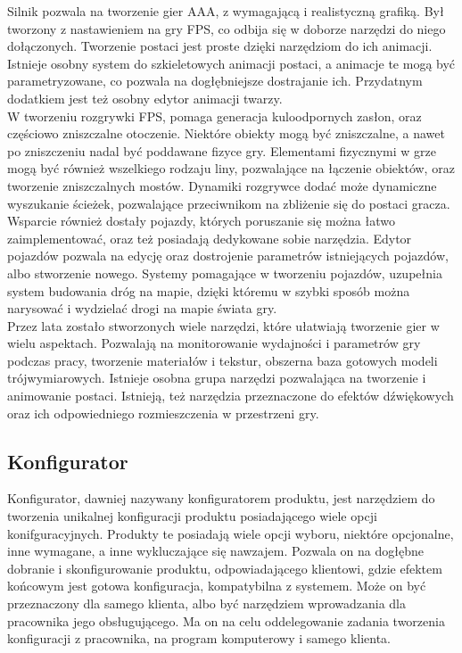 \documentclass{article} %
\begin{document}
        Silnik pozwala na tworzenie gier AAA, z wymagającą i realistyczną grafiką. Był tworzony z nastawieniem na gry FPS, co odbija się w doborze narzędzi do niego dołączonych. Tworzenie postaci jest proste dzięki narzędziom do ich animacji. Istnieje osobny system do szkieletowych animacji postaci, a animacje te mogą być parametryzowane, co pozwala na dogłębniejsze dostrajanie ich. Przydatnym dodatkiem jest też osobny edytor animacji twarzy.
        \\
        
        W tworzeniu rozgrywki FPS, pomaga generacja kuloodpornych zasłon, oraz częściowo zniszczalne otoczenie. Niektóre obiekty mogą być zniszczalne, a nawet po zniszczeniu nadal być poddawane fizyce gry. Elementami fizycznymi w grze mogą być również wszelkiego rodzaju liny, pozwalające na łączenie obiektów, oraz tworzenie zniszczalnych mostów. Dynamiki rozgrywce dodać może dynamiczne wyszukanie ścieżek, pozwalające przeciwnikom na zbliżenie się do postaci gracza.
        \\
        
        Wsparcie również dostały pojazdy, których poruszanie się można łatwo zaimplementować, oraz też posiadają dedykowane sobie narzędzia. Edytor pojazdów pozwala na edycję oraz dostrojenie parametrów istniejących pojazdów, albo stworzenie nowego. Systemy pomagające w tworzeniu pojazdów, uzupełnia system budowania dróg na mapie, dzięki któremu w szybki sposób można narysować i wydzielać drogi na mapie świata gry.
        \\
        
        Przez lata zostało stworzonych wiele narzędzi, które ułatwiają tworzenie gier w wielu aspektach. Pozwalają na monitorowanie wydajności i parametrów gry podczas pracy, tworzenie materiałów i tekstur, obszerna baza gotowych modeli trójwymiarowych. Istnieje osobna grupa narzędzi pozwalająca na tworzenie i animowanie postaci. Istnieją, też narzędzia przeznaczone do efektów dźwiękowych oraz ich odpowiedniego rozmieszczenia w przestrzeni gry.
        \\
        
        
        
    \subsection{Konfigurator}
        Konfigurator, dawniej nazywany konfiguratorem produktu, jest narzędziem do tworzenia unikalnej konfiguracji produktu posiadającego wiele opcji konifguracyjnych. Produkty te posiadają wiele opcji wyboru, niektóre opcjonalne, inne wymagane, a inne wykluczające się nawzajem. Pozwala on na dogłębne dobranie i skonfigurowanie produktu, odpowiadającego klientowi, gdzie efektem końcowym jest gotowa konfiguracja, kompatybilna z systemem. Może on być przeznaczony dla samego klienta, albo być narzędziem wprowadzania dla pracownika jego obsługującego. Ma on na celu oddelegowanie zadania tworzenia konfiguracji z pracownika, na program komputerowy i samego klienta.
        \\
        
\end{document}
